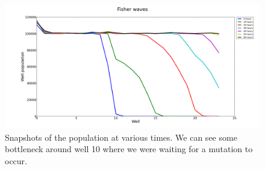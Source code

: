 \documentclass[a4paper,10pt]{article}
\begin{document}
 
  \begin{figure}
  \centering
  \includegraphics[width=0.95\linewidth]{waveprofiles}
\caption{Snapshots of the population at various times. We can see some bottleneck around well 10 where we were waiting for a mutation to occur.}
\label{fig:waveprofiles}
\end{figure}
 


 
 
 
% 
% 
%  
%  
%  
%  
 
 
% 
% 

 
 

 
 
% 
% 
% 
% 
% 
\end{document}
